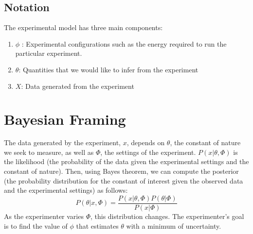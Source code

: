 \documentclass[10pt,journal,compsoc]{IEEEtran}
\begin{document}

\subsection{Notation}
The experimental model has three main components: 
\begin{enumerate}
\item $\phi$ : Experimental configurations such as the energy required to run the particular experiment.
\item $\theta$: Quantities that we would like to infer from the experiment
\item $X$: Data generated from the experiment
\end{enumerate}

% 

\section{Bayesian Framing}
The data generated by the experiment, $x$, depends on $\theta$, the constant of nature we seek to measure, as well as $\Phi$, the settings of the experiment. $P(x|\theta,\Phi)$ is the likelihood (the probability of the data given the experimental settings and the constant of nature). Then, using Bayes theorem, we can compute the posterior (the probability distribution for the constant of interest given the observed data and the experimental settings) as follows:
\begin{equation}
P(\theta|x,\Phi)=\frac{P(x|\theta,\Phi)P(\theta|\Phi)}{P(x|\Phi)}
\end{equation}
As the experimenter varies $\Phi$, this distribution changes. The experimenter's goal is to find the value of $\phi$ that estimates $\theta$ with a minimum of uncertainty.
\end{document}
